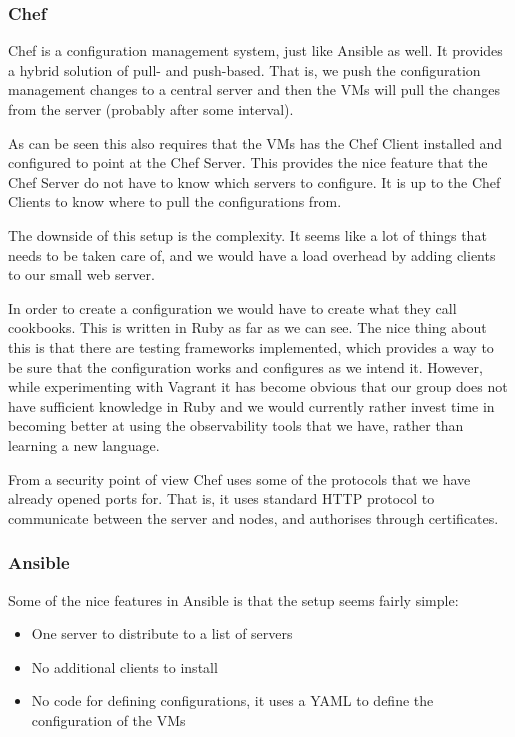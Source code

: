 \subsubsection{Chef}

Chef is a configuration management system, just like Ansible as well. It provides a hybrid solution of pull- and push-based. That is, we push the configuration management changes to a central server and then the VMs will pull the changes from the server (probably after some interval).

As can be seen this also requires that the VMs has the Chef Client installed and configured to point at the Chef Server. This provides the nice feature that the Chef Server do not have to know which servers to configure. It is up to the Chef Clients to know where to pull the configurations from.

The downside of this setup is the complexity. It seems like a lot of things that needs to be taken care of, and we would have a load overhead by adding clients to our small web server.

In order to create a configuration we would have to create what they call cookbooks. This is written in Ruby as far as we can see. The nice thing about this is that there are testing frameworks implemented, which provides a way to be sure that the configuration works and configures as we intend it. However, while experimenting with Vagrant it has become obvious that our group does not have sufficient knowledge in Ruby and we would currently rather invest time in becoming better at using the observability tools that we have, rather than learning a new language.

From a security point of view Chef uses some of the protocols that we have already opened ports for. That is, it uses standard HTTP protocol to communicate between the server and nodes, and authorises through certificates.

\subsubsection{Ansible}

Some of the nice features in Ansible is that the setup seems fairly simple:

\begin{itemize}
    \item One server to distribute to a list of servers
    \item No additional clients to install
    \item No code for defining configurations, it uses a YAML to define the configuration of the VMs
\end{itemize}


